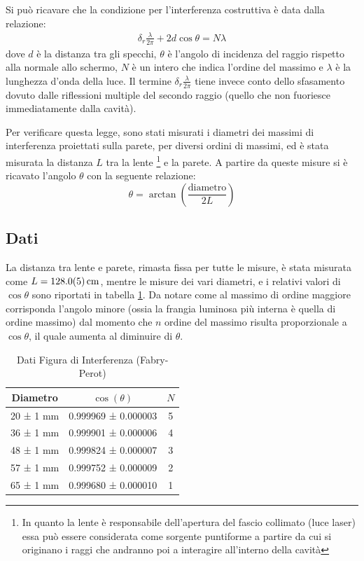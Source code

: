 \documentclass[a4paper]{article}
\begin{document}
Si può ricavare che la condizione per l'interferenza costruttiva è data dalla relazione:
\begin{align}
   \delta_r\frac{\lambda}{2\pi}+ 2d \cos \theta = N\lambda
\label{eq: max interferenza fabry-perot}
\end{align}
dove $d$ è la distanza tra gli specchi, $\theta$ è l'angolo di incidenza del raggio rispetto alla normale allo schermo, $N$ è un intero che indica l'ordine del massimo e $\lambda$ è la lunghezza d'onda della luce.
Il termine $\delta_r\frac{\lambda}{2\pi}$ tiene invece conto dello sfasamento dovuto dalle riflessioni multiple del secondo raggio (quello che non fuoriesce immediatamente dalla cavità).

Per verificare questa legge, sono stati misurati i diametri dei massimi di interferenza proiettati sulla parete, per diversi ordini di massimi, ed è stata misurata la distanza $L$ tra la lente \footnote{In quanto la lente è responsabile dell'apertura del fascio collimato (luce laser) essa può essere considerata come sorgente puntiforme a partire da cui si originano i raggi che andranno poi a interagire all'interno della cavità} e la parete. A partire da queste misure si è ricavato l'angolo $\theta$ con la seguente relazione:
\[\theta = \arctan \left(\frac{\text{diametro}}{2L}\right)\]

\subsection{Dati}
La distanza tra lente e parete, rimasta fissa per tutte le misure, è stata misurata come $L=\SI{128 \pm 0.5}{\centi\meter}$, mentre le misure dei vari diametri, e i relativi valori di $\cos{\theta}$ sono riportati in tabella \ref{tab:fabry-perot-dati}. Da notare come al massimo di ordine maggiore corrisponda l'angolo minore (ossia la frangia luminosa più interna è quella di ordine massimo) dal momento che $n$ ordine del massimo risulta proporzionale a $\cos{\theta}$, il quale aumenta al diminuire di $\theta$.
\begin{table}[htbp]
\centering
\caption{Dati Figura di Interferenza (Fabry-Perot)}
\begin{tabular}{|c|c|c|}
\hline
Diametro & $\cos(\theta)$ & $N$ \\\hline\hline
20 ± 1 mm & 0.999969 ± 0.000003  & 5 \\
36 ± 1 mm & 0.999901 ± 0.000006  & 4 \\
48 ± 1 mm & 0.999824 ± 0.000007  & 3 \\
57 ± 1 mm & 0.999752 ± 0.000009  & 2 \\
65 ± 1 mm & 0.999680 ± 0.000010  & 1 \\
\hline
\end{tabular}
\label{tab:fabry-perot-dati}
\end{table}
\end{document}
